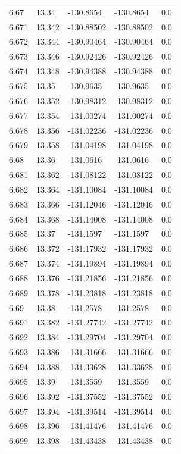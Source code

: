 \begin{tabular}{lllll}
6.67 & 13.34 & -130.8654 & -130.8654 & 0.0 \\
6.671 & 13.342 & -130.88502 & -130.88502 & 0.0 \\
6.672 & 13.344 & -130.90464 & -130.90464 & 0.0 \\
6.673 & 13.346 & -130.92426 & -130.92426 & 0.0 \\
6.674 & 13.348 & -130.94388 & -130.94388 & 0.0 \\
6.675 & 13.35 & -130.9635 & -130.9635 & 0.0 \\
6.676 & 13.352 & -130.98312 & -130.98312 & 0.0 \\
6.677 & 13.354 & -131.00274 & -131.00274 & 0.0 \\
6.678 & 13.356 & -131.02236 & -131.02236 & 0.0 \\
6.679 & 13.358 & -131.04198 & -131.04198 & 0.0 \\
6.68 & 13.36 & -131.0616 & -131.0616 & 0.0 \\
6.681 & 13.362 & -131.08122 & -131.08122 & 0.0 \\
6.682 & 13.364 & -131.10084 & -131.10084 & 0.0 \\
6.683 & 13.366 & -131.12046 & -131.12046 & 0.0 \\
6.684 & 13.368 & -131.14008 & -131.14008 & 0.0 \\
6.685 & 13.37 & -131.1597 & -131.1597 & 0.0 \\
6.686 & 13.372 & -131.17932 & -131.17932 & 0.0 \\
6.687 & 13.374 & -131.19894 & -131.19894 & 0.0 \\
6.688 & 13.376 & -131.21856 & -131.21856 & 0.0 \\
6.689 & 13.378 & -131.23818 & -131.23818 & 0.0 \\
6.69 & 13.38 & -131.2578 & -131.2578 & 0.0 \\
6.691 & 13.382 & -131.27742 & -131.27742 & 0.0 \\
6.692 & 13.384 & -131.29704 & -131.29704 & 0.0 \\
6.693 & 13.386 & -131.31666 & -131.31666 & 0.0 \\
6.694 & 13.388 & -131.33628 & -131.33628 & 0.0 \\
6.695 & 13.39 & -131.3559 & -131.3559 & 0.0 \\
6.696 & 13.392 & -131.37552 & -131.37552 & 0.0 \\
6.697 & 13.394 & -131.39514 & -131.39514 & 0.0 \\
6.698 & 13.396 & -131.41476 & -131.41476 & 0.0 \\
6.699 & 13.398 & -131.43438 & -131.43438 & 0.0 \\

\end{tabular}

